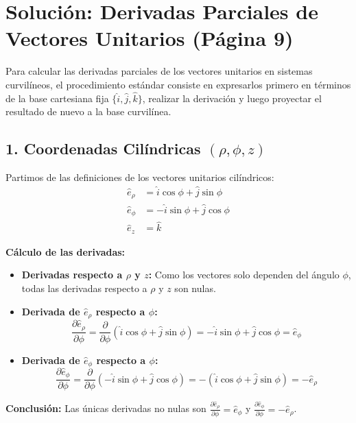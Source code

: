 \documentclass[a4paper]{article}
\begin{document}
\section*{Solución: Derivadas Parciales de Vectores Unitarios (Página 9)}

Para calcular las derivadas parciales de los vectores unitarios en sistemas curvilíneos, el procedimiento estándar consiste en expresarlos primero en términos de la base cartesiana fija $\{\hat{i}, \hat{j}, \hat{k}\}$, realizar la derivación y luego proyectar el resultado de nuevo a la base curvilínea.

\subsection*{1. Coordenadas Cilíndricas $(\rho, \phi, z)$}

Partimos de las definiciones de los vectores unitarios cilíndricos:
\begin{align*}
    \hat{e}_\rho &= \hat{i} \cos\phi + \hat{j} \sin\phi \\
    \hat{e}_\phi &= -\hat{i} \sin\phi + \hat{j} \cos\phi \\
    \hat{e}_z &= \hat{k}
\end{align*}

\textbf{Cálculo de las derivadas:}
\begin{itemize}
    \item \textbf{Derivadas respecto a $\rho$ y $z$:} Como los vectores solo dependen del ángulo $\phi$, todas las derivadas respecto a $\rho$ y $z$ son nulas.
    \item \textbf{Derivada de $\hat{e}_\rho$ respecto a $\phi$:}
    \begin{equation*}
        \frac{\partial \hat{e}_\rho}{\partial \phi} = \frac{\partial}{\partial \phi} (\hat{i} \cos\phi + \hat{j} \sin\phi) = -\hat{i} \sin\phi + \hat{j} \cos\phi = \hat{e}_\phi
    \end{equation*}
    \item \textbf{Derivada de $\hat{e}_\phi$ respecto a $\phi$:}
    \begin{equation*}
        \frac{\partial \hat{e}_\phi}{\partial \phi} = \frac{\partial}{\partial \phi} (-\hat{i} \sin\phi + \hat{j} \cos\phi) = -(\hat{i} \cos\phi + \hat{j} \sin\phi) = -\hat{e}_\rho
    \end{equation*}
\end{itemize}
\textbf{Conclusión:} Las únicas derivadas no nulas son $\frac{\partial \hat{e}_\rho}{\partial \phi} = \hat{e}_\phi$ y $\frac{\partial \hat{e}_\phi}{\partial \phi} = -\hat{e}_\rho$.
\end{document}
